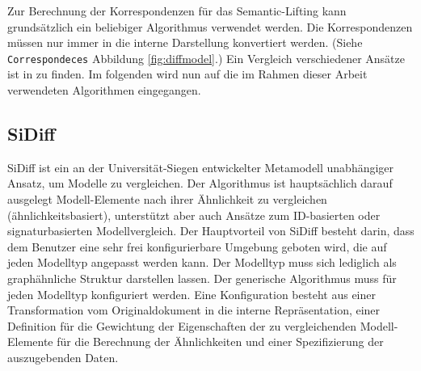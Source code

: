 Zur Berechnung der Korrespondenzen für das Semantic-Lifting kann grundsätzlich ein beliebiger
Algorithmus verwendet werden. Die Korrespondenzen müssen nur immer in die interne Darstellung
konvertiert werden. (Siehe \texttt{Correspondeces} Abbildung \ref{fig:diffmodel}.) Ein Vergleich
verschiedener Ansätze ist in \cite{KPRP2009} zu finden. Im folgenden wird nun auf die im Rahmen
dieser Arbeit verwendeten Algorithmen eingegangen.


\subsection{SiDiff}
\label{sidiff}

SiDiff ist ein an der Universität-Siegen entwickelter Metamodell unabhängiger Ansatz, um Modelle zu
vergleichen. Der Algorithmus ist hauptsächlich darauf ausgelegt Modell-Elemente nach ihrer
Ähnlichkeit zu vergleichen (ähnlichkeitsbasiert), unterstützt aber auch Ansätze zum ID-basierten
oder signaturbasierten Modellvergleich. Der Hauptvorteil von SiDiff besteht darin, dass dem
Benutzer eine sehr frei konfigurierbare Umgebung geboten wird, die auf jeden Modelltyp angepasst
werden kann. Der Modelltyp muss sich lediglich als graphähnliche Struktur darstellen lassen. Der
generische Algorithmus muss für jeden Modelltyp konfiguriert werden. Eine Konfiguration besteht aus
einer Transformation vom Originaldokument in die interne Repräsentation, einer Definition für die
Gewichtung der Eigenschaften der zu vergleichenden Modell-Elemente für die Berechnung der
Ähnlichkeiten und einer Spezifizierung der auszugebenden Daten. \cite{SiDiff}

